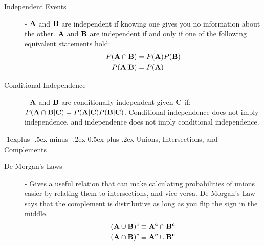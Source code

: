 \documentclass[10pt,landscape]{article}
\makeatletter
\renewcommand{\subsection}{\@startsection{subsection}{2}{0mm}%
                                {-1explus -.5ex minus -.2ex}%
                                {0.5ex plus .2ex}%
                                {\normalfont\normalsize\bfseries}}
\makeatother
\begin{document}
\begin{multicols}{3}
    \begin{description}
        \item[Independent Events] - ${\bf A}$ and ${\bf B}$ are independent if knowing one gives you no information about the other. ${\bf A}$ and ${\bf B}$ are independent if and only if one of the following equivalent statements hold: 
           \begin{align*} 
            P({\bf A}\cap {\bf B}) &= P({\bf A})P({\bf B}) \\
            P({\bf A}|{\bf B}) &= P({\bf A})
           \end{align*}
        \item[Conditional Independence] - ${\bf A}$ and ${\bf B}$ are conditionally independent given ${\bf C}$ if: $P({\bf A}\cap {\bf B}|{\bf C}) = P({\bf A}|{\bf C})P({\bf B}|{\bf C})$. Conditional independence does not imply independence, and independence does not imply conditional independence.
    \end{description}
    
\subsection{Unions, Intersections, and Complements}

    \begin{description}

        \item[De Morgan's Laws] - Gives a useful relation that can make calculating probabilities of unions easier by relating them to intersections, and vice versa. De Morgan's Law says that the complement is distributive as long as you flip the sign in the middle.
           \begin{align*} 
        ({\bf A} \cup {\bf B})^c \equiv {\bf A^c} \cap {\bf B^c} \\
        ({\bf A} \cap {\bf B})^c \equiv {\bf A^c} \cup {\bf B^c}
           \end{align*} 
                  


\end{description}
\end{multicols}
\end{document}
